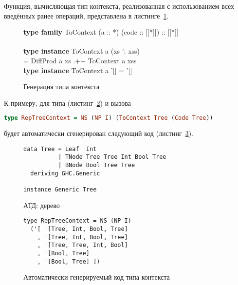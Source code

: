 Функция, вычисляющая тип контекста, реализованная с использованием всех введённых ранее операций, представлена в листинге~\ref{list:to-context}.\newpage
\begin{figure}[h]
\begin{framed}
\ttfamily\small
\textbf{type family} ToContext (a :: *) (code :: [[*]]) :: [[*]]\\
\\
\textbf{type instance} ToContext a (xs ': xss)\\
\ind = DiffProd a xs .++ ToContext a xss\\
\textbf{type instance} ToContext a '[] = '[]
\end{framed}
\caption{Генерация типа контекста}
\label{list:to-context}
\end{figure}

К примеру, для типа  (листинг~\ref{list:tree}) и вызова
\begin{lstlisting}[language=Haskell]
type RepTreeContext = NS (NP I) (ToContext Tree (Code Tree))
\end{lstlisting}
будет автоматически сгенерирован следующий код (листинг~\ref{list:rep-context}).
\begin{figure}[h]
\begin{framed}
\vspace{-0.25cm}
\begin{lstlisting}
data Tree = Leaf  Int
          | TNode Tree Tree Int Bool Tree
          | BNode Bool Tree Tree
  deriving GHC.Generic

instance Generic Tree
\end{lstlisting}
\vspace{-0.25cm}
\end{framed}
\caption{АТД: дерево}
\label{list:tree}
\end{figure}

\begin{figure}[h]
\begin{framed}
\vspace{-0.25cm}
\begin{lstlisting}
type RepTreeContext = NS (NP I)
  ('[ '[Tree, Int, Bool, Tree]
    , '[Tree, Int, Bool, Tree]
    , '[Tree, Tree, Int, Bool]
    , '[Bool, Tree]
    , '[Bool, Tree] ])
\end{lstlisting}
\vspace{-0.25cm}
\end{framed}
\caption{Автоматически генерируемый код типа контекста}
\label{list:rep-context}
\end{figure}


